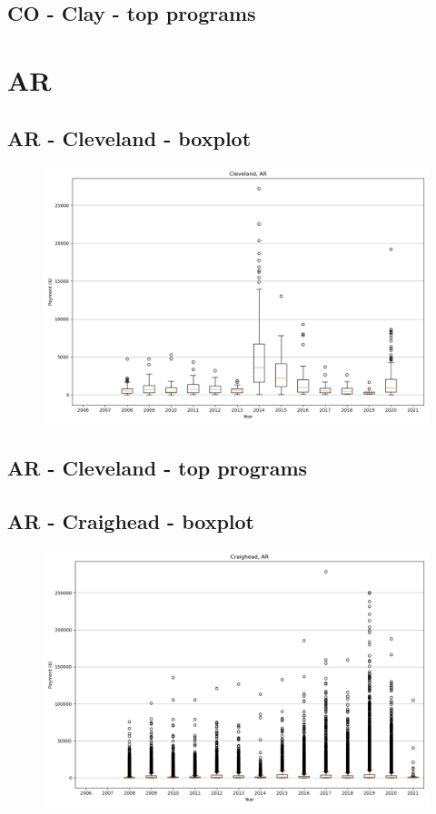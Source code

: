 \subsection*{CO - Clay - top programs}

\newpage
\section*{AR}
\subsection*{AR - Cleveland - boxplot}
\begin{figure}[h]
\centering
\includegraphics[width=7in]{../output/boxplots/counties/Cleveland-AR_boxplot.png}
\end{figure}


\subsection*{AR - Cleveland - top programs}

\newpage
\subsection*{AR - Craighead - boxplot}
\begin{figure}[h]
\centering
\includegraphics[width=7in]{../output/boxplots/counties/Craighead-AR_boxplot.png}
\end{figure}


